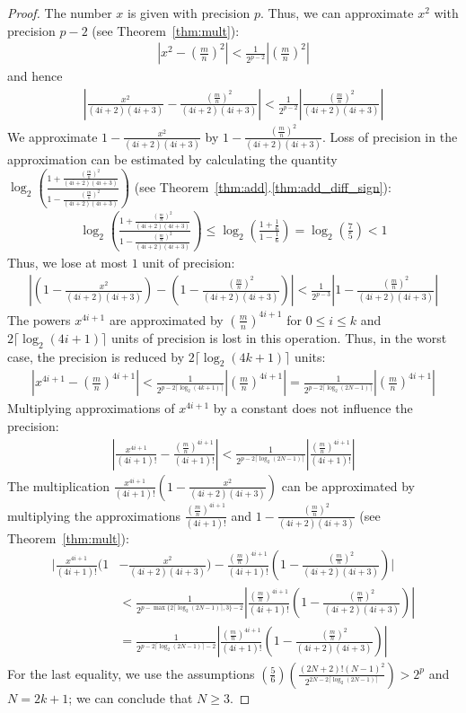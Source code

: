 \documentclass{article}
\numberwithin{mytheorem}{section}
\begin{document}
\begin{proof}
The number $x$ is given with precision $p$. Thus, we can approximate $x^2$ with precision $p-2$ (see Theorem~\ref{thm:mult}):
\begin{align*}
|x^2-(\frac{m}{n})^2|<\frac{1}{2^{p-2}}|(\frac{m}{n})^2|
\end{align*}
and hence
\begin{align*}
|\frac{x^2}{(4i+2)(4i+3)}-\frac{(\frac{m}{n})^2}{(4i+2)(4i+3)}|<\frac{1}{2^{p-2}}|\frac{(\frac{m}{n})^2}{(4i+2)(4i+3)}|
\end{align*}
We approximate $1-\frac{x^2}{(4i+2)(4i+3)}$ by $1-\frac{(\frac{m}{n})^2}{(4i+2)(4i+3)}$. Loss of precision in the approximation can be estimated by calculating the quantity $\log_2(\frac{1+\frac{(\frac{m}{n})^2}{(4i+2)(4i+3)}}{1-\frac{(\frac{m}{n})^2}{(4i+2)(4i+3)}})$ (see Theorem~\ref{thm:add}.\ref{thm:add_diff_sign}):
\begin{align*}
\log_2(\frac{1+\frac{(\frac{m}{n})^2}{(4i+2)(4i+3)}}{1-\frac{(\frac{m}{n})^2}{(4i+2)(4i+3)}})\leq \log_2(\frac{1+\frac{1}{6}}{1-\frac{1}{6}})=\log_2(\frac{7}{5})<1
\end{align*}
Thus, we lose at most $1$ unit of precision:
\begin{align*}
|(1-\frac{x^2}{(4i+2)(4i+3)})-(1-\frac{(\frac{m}{n})^2}{(4i+2)(4i+3)})|<\frac{1}{2^{p-3}}|1-\frac{(\frac{m}{n})^2}{(4i+2)(4i+3)}|
\end{align*}
The powers $x^{4i+1}$ are approximated by $(\frac{m}{n})^{4i+1}$ for $0\leq i\leq k$ and $2\lceil\log_2(4i+1) \rceil$ units of precision is lost in this operation. Thus, in the worst case, the precision is reduced by $2\lceil\log_2(4k+1) \rceil$ units: 
\begin{align*}
|x^{4i+1}-(\frac{m}{n})^{4i+1}|<\frac{1}{2^{p-2\lceil\log_2(4k+1)\rceil}}|(\frac{m}{n})^{4i+1}|=\frac{1}{2^{p-2\lceil\log_2(2N-1)\rceil}}|(\frac{m}{n})^{4i+1}|
\end{align*}
Multiplying approximations of $x^{4i+1}$ by a constant does not influence the precision:
\begin{align*}
|\frac{x^{4i+1}}{(4i+1)!}-\frac{(\frac{m}{n})^{4i+1}}{(4i+1)!}|<\frac{1}{2^{p-2\lceil\log_2(2N-1)\rceil}}| \frac{(\frac{m}{n})^{4i+1}}{(4i+1)!}|
\end{align*}
The multiplication $\frac{x^{4i+1}}{(4i+1)!}(1-\frac{x^2}{(4i+2)(4i+3)})$ can be approximated by multiplying the approximations $\frac{(\frac{m}{n})^{4i+1}}{(4i+1)!}$ and $1-\frac{(\frac{m}{n})^2}{(4i+2)(4i+3)}$ (see Theorem~\ref{thm:mult}):
\begin{align*}
|\frac{x^{4i+1}}{(4i+1)!}(1&-\frac{x^2}{(4i+2)(4i+3)})-\frac{(\frac{m}{n})^{4i+1}}{(4i+1)!}(1-\frac{(\frac{m}{n})^2}{(4i+2)(4i+3)})|\\
&<\frac{1}{2^{p-\max\{2\lceil\log_2(2N-1) \rceil,3\}-2}}|\frac{(\frac{m}{n})^{4i+1}}{(4i+1)!}(1-\frac{(\frac{m}{n})^2}{(4i+2)(4i+3)})|\\
&=\frac{1}{2^{p-2\lceil\log_2(2N-1) \rceil-2}}|\frac{(\frac{m}{n})^{4i+1}}{(4i+1)!}(1-\frac{(\frac{m}{n})^2}{(4i+2)(4i+3)})|
\end{align*}
For the last equality, we use the assumptions $(\frac{5}{6})(\frac{(2N+2)!(N-1)^2}{2^{2N-2\lceil\log_2(2N-1) \rceil}})>2^p$ and $N=2k+1$; we can conclude that $N\geq 3$.


\end{proof}
\end{document}
